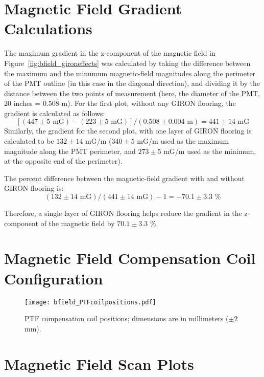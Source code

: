 
\appendix

\section{Magnetic Field Gradient Calculations}
\label{Appendix:MagneticFieldGradientCalculations}

The maximum gradient in the z-component of the magnetic field in Figure~\ref{fig:bfield_gironeffects} was calculated by taking the difference between the maximum and the minumum magnetic-field magnitudes along the perimeter of the PMT outline (in this case in the diagonal direction), and dividing it by the distance between the two points of measurement (here, the diameter of the PMT, 20 inches = 0.508 m).
For the first plot, without any GIRON flooring, the gradient is calculated as follows:
\[[(447\pm5 \text{ mG}) - (223\pm5 \text{ mG})]/ (0.508\pm0.004 \text{ m} ) = 441\pm14 \text{ mG} \]
Similarly, the gradient for the second plot, with one layer of GIRON flooring is calculated to be $ 132\pm14 $ mG/m ($ 340\pm5 $ mG/m used as the maximum magnitude along the PMT perimeter, and $ 273\pm5 $ mG/m used as the minimum, at the opposite end of the perimeter).

The percent difference between the magnetic-field gradient with and without GIRON flooring is:
\[(132\pm14 \text{ mG})/(441\pm14 \text{ mG}) - 1 = -70.1\pm3.3 \text{ \%}\]

Therefore, a single layer of GIRON flooring helps reduce the gradient in the z-component of the magnetic field by $ 70.1\pm3.3 $ \%.

\section{Magnetic Field Compensation Coil Configuration}
\label{Appendix:CoilPositions}
%
\begin{figure}[H]
  \begin{center}
  \texttt{[image: bfield\_PTFcoilpositions.pdf]}
  \caption{PTF compensation coil positions; dimensions are in millimeters ($\pm2$ mm).}
  \label{fig:coilpos}
  \end{center}
\end{figure}
%

\newpage

\section{Magnetic Field Scan Plots}
\label{Appendix:MagneticFieldScanPlots}

